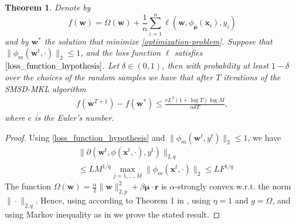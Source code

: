 \documentclass{article}
\newtheorem{theorem}{Theorem}
\begin{document}
\begin{theorem}
Denote by $$f(\mathbf w)=\Omega(\mathbf w)+\frac{1}{n}\sum_{i=1}^n\ell(\mathbf w,\phi_{\bm \mu}(\mathbf{x}_i),y_i)$$
and by $\mathbf w^\ast$ the solution that minimize \eqref{optimization-problem}.
Suppose that $\|\phi_m(\mathbf w^t,\cdot)\|_2 \leq 1$, and the loss function $\ell$ satisfies $\eqref{loss_function_hypothesis}$.
Let $\delta \in (0,1)$, then with probability at least $1 - \delta$ over the choices of the random samples
we have that after $T$ iterations of the SMSD-MKL algorithm
\begin{align*}
    f(\mathbf w^{T+1})-f(\mathbf w^\ast) \leq \frac{eL^2(1+\log T)\log M}{\alpha\delta T},
\end{align*}
where $e$ is the Euler's number.
\end{theorem}
\begin{proof}
Using \eqref{loss_function_hypothesis} and $\|\phi_m(\mathbf w^t, y^t)\|_2 \leq 1$, we have
\begin{align*}
    &\|\partial(\mathbf w^t,\phi(\mathbf{x}^t,\cdot), y^t)\|_{2,q} \\
    &\leq LM^{1/q} \max_{j=1, \ldots, M} \|\phi_m(\mathbf{x}^t, \cdot)\|_2 \leq LF^{1/q}
\end{align*}
The function $\Omega(\mathbf w)=\frac{\alpha}{2}\|\mathbf w\|_{2,p}^2 + \beta\mathbf{\mu} \cdot \mathbf{r}$ is
 $\alpha$-strongly convex w.r.t. the norm $\|\cdot\|_{2,q}$. Hence, using according to Theorem 1 in \cite{Shalev-ShwartzSS07},
 using $\eta=1$ and $g=\Omega$, and using Markov inequality as in \cite{Shalev-ShwartzSS07} we prove the stated result.
\end{proof}
\end{document}
